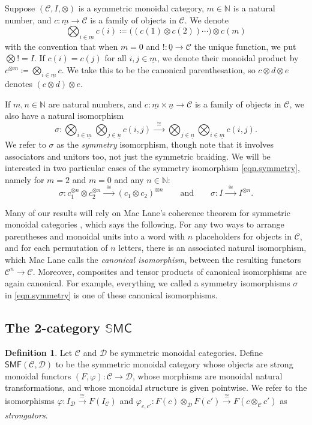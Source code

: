 \documentclass[11pt, oneside, article]{memoir}
\theoremstyle{plain}
\theoremstyle{definition}
\newtheorem{definition}[theorem]{Definition}
\theoremstyle{remark}
\newcommand{\ord}[1]{\underline{#1}}%
\newcommand{\cat}[1]{\mathcal{#1}}%
\newcommand{\Cat}[1]{{\mathsf{#1}}}%
\newcommand{\tpow}[1]{^{\otimes #1}}
\newcommand{\smf}{\Cat{SMF}}
\newcommand{\nn}{\mathbb{N}}
\newcommand{\To}[1]{\xrightarrow{#1}}
\newcommand{\Too}[1]{\To{\;\;#1\;\;}}
\newcommand{\qqand}{\qquad\text{and}\qquad}
\begin{document}
Suppose $(\cat{C}, I, \otimes)$ is a symmetric monoidal category, $m\in\nn$ is a natural number, and $c\colon\ord{m}\to\cat{C}$ is a family of objects in $\cat{C}$. We denote
\[
	\bigotimes_{i\in\ord{m}}c(i)\coloneqq
  \big((c(1)\otimes c(2))\cdots\big)\otimes c(m)
\]
with the convention that when $m=0$ and $!\colon\ord{0}\to \cat{C}$ the unique function, we put $\bigotimes != I$. If $c(i)=c(j)$ for all $i,j\in\ord{m}$, we denote their monoidal product by $c\tpow{m}\coloneqq\bigotimes_{i\in\ord{m}}c$. We take this to be the canonical parenthesation, so $c\otimes d\otimes e$ denotes $(c\otimes d)\otimes e$. 

If $m,n\in\nn$ are natural numbers, and $c\colon \ord{m}\times \ord{n}\to\cat{C}$ is a family of objects in $\cat{C}$, we also have a natural isomorphism
\begin{equation}\label{eqn.symmetry}
\sigma\colon
\bigotimes_{i\in\ord{m}}\bigotimes_{j\in\ord{n}}c(i,j)\Too{\cong}
\bigotimes_{j\in\ord{n}}\bigotimes_{i\in\ord{m}}c(i,j).
\end{equation}
We refer to $\sigma$ as the \emph{symmetry} isomorphism, though note that it involves associators and unitors too, not just the symmetric braiding. We will be interested in two particular cases of the symmetry isomorphism \cref{eqn.symmetry}, namely for $m=2$ and $m=0$ and any $n\in\nn$:
\[\sigma\colon c_1\tpow{n}\otimes c_2\tpow{n}\Too{\cong}(c_1\otimes c_2)\tpow{n}
\qqand
\sigma\colon I\Too{\cong} I\tpow{n}.
\]

Many of our results will rely on Mac Lane's coherence theorem for symmetric monoidal categories \cite[Theorem XI.1]{MacLane:1998a}, which says the following. For any two ways to arrange parentheses and monoidal units into a word with $n$ placeholders for objects in $\cat{C}$, and for each permutation of $n$ letters, there is an associated natural isomorphism, which Mac Lane calls the \emph{canonical isomorphism}, between the resulting functors $\cat{C}^n\to\cat{C}$. Moreover, composites and tensor products of canonical isomorphisms are again canonical. For example, everything we called a symmetry isomorphisms $\sigma$ in \cref{eqn.symmetry} is one of these canonical isomorphisms.

\subsection{The 2-category $\mathbb{S}\Cat{MC}$}

\begin{definition}\label{def.smf}
Let $\cat{C}$ and $\cat{D}$ be symmetric monoidal categories. Define $\smf(\cat{C},\cat{D})$ to be the symmetric monoidal category whose objects are strong monoidal functors $(F,\varphi)\colon\cat{C}\to\cat{D}$, whose morphisms are monoidal natural transformations, and whose monoidal structure is given pointwise. We refer to the isomorphisms $\varphi\colon I_{\cat{D}}\To{\cong} F(I_{\cat{C}})$ and $\varphi_{c,c'}\colon F(c)\otimes_{\cat{D}} F(c')\To{\cong} F(c\otimes_{\cat{C}} c')$ as \emph{strongators}.
\end{definition}
\end{document}
